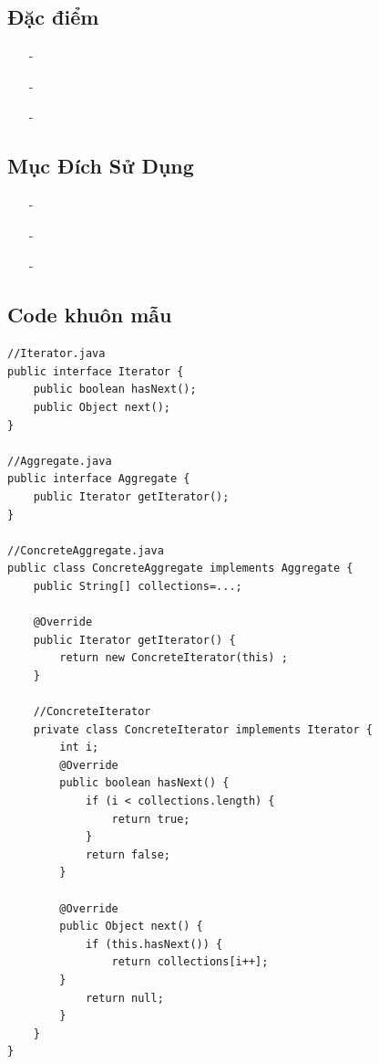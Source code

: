 \documentclass{article}
\newcommand\subpara{\fontsize{13}{13}\selectfont \fontseries{b}\selectfont}
\begin{document}
    \subsection{Đặc điểm}
    \begin{itemize}
        \item[-]\subpara{Tách phần cài đặt các phương thức của tập hợp (collection) và phần duyệt qua các phần tử (iterator) theo từng class riêng lẻ}
        \item[-]\subpara{Có thể implement các loại collection mới và iterator mới, sau đó chuyển chúng vào code hiện có}
        \item[-]\subpara{Có thể truy cập song song trên cùng một collection vì mỗi đối tượng iterator có chứa trạng thái riêng của nó}
    \end{itemize}

    \subsection{Mục Đích Sử Dụng}
    \begin{itemize}
        \item[-]\subpara{Truy cập nội dung của đối tượng trong tập hợp mà không cần biết nội dung cài đặt bên trong}
        \item[-]\subpara{Hỗ trợ truy xuất nhiều loại tập hợp khác nhau}
        \item[-]\subpara{Cung cấp một interface duy nhất, đơn giản, nhất quán để làm việc với các tập hợp khác nhau}
    \end{itemize}

    \subsection{Code khuôn mẫu}
    \begin{lstlisting}
//Iterator.java
public interface Iterator {
    public boolean hasNext();
    public Object next();
}

//Aggregate.java
public interface Aggregate {
    public Iterator getIterator();
}

//ConcreteAggregate.java
public class ConcreteAggregate implements Aggregate {
    public String[] collections=...;

    @Override
    public Iterator getIterator() {
        return new ConcreteIterator(this) ;
    }

    //ConcreteIterator
    private class ConcreteIterator implements Iterator {
        int i;
        @Override
        public boolean hasNext() {
            if (i < collections.length) {
                return true;
            }
            return false;
        }

        @Override
        public Object next() {
            if (this.hasNext()) {
                return collections[i++];
        }
            return null;
        }
    }
}
    \end{lstlisting}
\end{document}

